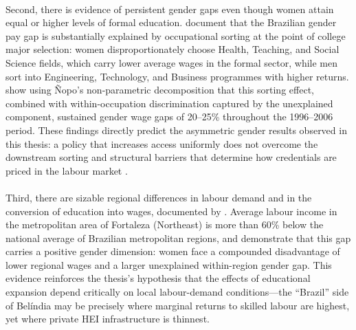 \paragraph{}
Second, there is evidence of persistent gender gaps even though women attain equal or higher levels of formal education.  document that the Brazilian gender pay gap is substantially explained by occupational sorting at the point of college major selection: women disproportionately choose Health, Teaching, and Social Science fields, which carry lower average wages in the formal sector, while men sort into Engineering, Technology, and Business programmes with higher returns.  show using Ñopo's non-parametric decomposition that this sorting effect, combined with within-occupation discrimination captured by the unexplained component, sustained gender wage gaps of 20--25\% throughout the 1996--2006 period. These findings directly predict the asymmetric gender results observed in this thesis: a policy that increases access uniformly does not overcome the downstream sorting and structural barriers that determine how credentials are priced in the labour market \cite{Goldin2014}.
\paragraph{}
Third, there are sizable regional differences in labour demand and in the conversion of education into wages, documented by . Average labour income in the metropolitan area of Fortaleza (Northeast) is more than 60\% below the national average of Brazilian metropolitan regions, and  demonstrate that this gap carries a positive gender dimension: women face a compounded disadvantage of lower regional wages and a larger unexplained within-region gender gap. This evidence reinforces the thesis's hypothesis that the effects of educational expansion depend critically on local labour-demand conditions---the ``Brazil'' side of Belíndia may be precisely where marginal returns to skilled labour are highest, yet where private HEI infrastructure is thinnest.
